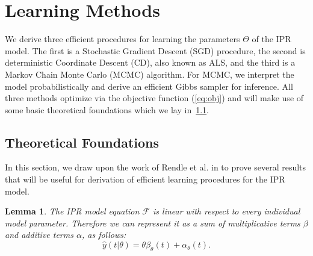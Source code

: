 \documentclass[10pt]{proc}
\newtheorem{lemma}{Lemma}
\begin{document}
\section{Learning Methods}

We derive three efficient procedures for learning the parameters
$\Theta$ of the IPR model. The first is a Stochastic Gradient Descent (SGD)
procedure, the second is deterministic Coordinate Descent (CD), also known as
ALS, and the third is a Markov Chain Monte Carlo (MCMC) algorithm. For MCMC, we
interpret the model probabilistically and derive an efficient Gibbs sampler for
inference. All three methods optimize via the objective function (\ref{eq:obj})
and will make use of some basic theoretical foundations which we lay
in~\ref{theoretical-foundations}.


\subsection{Theoretical Foundations} \label{theoretical-foundations}

In this section, we draw upon the work of Rendle et al. in
\cite{rendle_fast_2011} to prove several results that will be useful for
derivation of efficient learning procedures for the IPR model.

\begin{lemma}
    The IPR model equation $\mathcal{F}$ is linear with respect to every
    individual model parameter. Therefore we can represent it as a sum of
    multiplicative terms $\beta$ and additive terms $\alpha$, as follows:
    \begin{equation}  \label{eq:yhat-decomp}
        \hat{y}(t | \theta) = \theta\beta_\theta(t) + \alpha_\theta(t).
    \end{equation}
\end{lemma}
\end{document}
